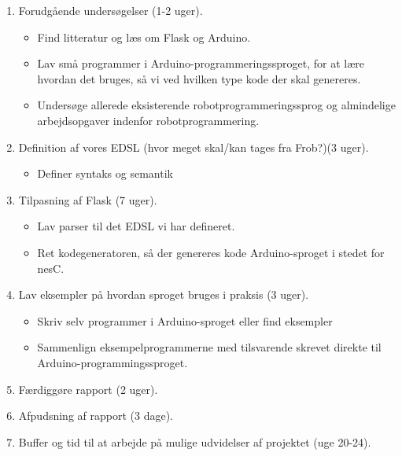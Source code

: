 \documentclass[a4paper,oneside, draft]{memoir}
\begin{document}
\begin{enumerate}

\item Forudgående undersøgelser (1-2 uger).
  
  \begin{itemize}

  \item Find litteratur og læs om Flask og Arduino.

  \item Lav små programmer i Arduino-programmeringssproget, for at lære hvordan
    det bruges, så vi ved hvilken type kode der skal genereres.

  \item Undersøge allerede eksisterende robotprogrammeringssprog og almindelige
    arbejdsopgaver indenfor robotprogrammering.

  \end{itemize}

\item Definition af vores EDSL (hvor meget skal/kan tages fra Frob?)(3
  uger).  \label{item:opgaver:definer-syntaks}
  \begin{itemize}

  \item Definer syntaks og semantik

  \end{itemize}

\item Tilpasning af Flask (7 uger).
  \begin{itemize}

  \item Lav parser til det EDSL vi har defineret.

  \item Ret kodegeneratoren, så der genereres kode Arduino-sproget i
    stedet for nesC.

  \end{itemize}


\item Lav eksempler på hvordan sproget bruges i praksis (3 uger).
  \label{item:opgaver:lav-eksempler}

  \begin{itemize}

  \item Skriv selv programmer i Arduino-sproget eller find eksempler

  \item Sammenlign eksempelprogrammerne med tilsvarende skrevet direkte til
    Arduino-programmingssproget.  

  \end{itemize}
    
\item Færdiggøre rapport (2 uger).
  
\item Afpudsning af rapport (3 dage).
  
\item Buffer og tid til at arbejde på mulige udvidelser af projektet (uge 20-24).

\end{enumerate}
\end{document}
